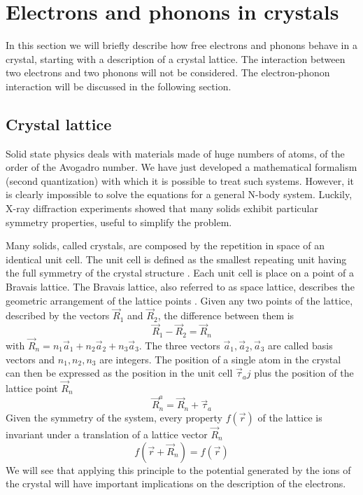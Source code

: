 \section{Electrons and phonons in crystals}
In this section we will briefly describe how free electrons and phonons behave in a crystal, starting with a description of a crystal lattice. The interaction between two electrons and two phonons will not be considered. The electron-phonon interaction will be discussed in the following section.
\subsection{Crystal lattice}
Solid state physics deals with materials made of huge numbers of atoms, of the order of the Avogadro number. We have just developed a mathematical formalism (second quantization) with which it is possible to treat such systems. However, it is clearly impossible to solve the equations for a general N-body system. Luckily, X-ray diffraction experiments showed that many solids exhibit particular symmetry properties, useful to simplify the problem.

Many solids, called crystals, are composed by the repetition in space of an identical unit cell. The unit cell is defined as the smallest repeating unit having the full symmetry of the crystal structure \cite{westBasicSolidState1999}.
Each unit cell is place on a point of a Bravais lattice. The Bravais lattice, also referred to as space lattice, describes the geometric arrangement of the lattice points \cite{lernerEncyclopediaPhysicsVolumes2005}. Given any two points of the lattice, described by the vectors $\vec{R}_1$ and $\vec{R}_2$, the difference between them is
\begin{equation}
    \vec{R}_1 - \vec{R}_2 = \vec{R}_n
\end{equation}
with $\vec{R}_n = n_1\vec{a}_1 + n_2\vec{a}_2 + n_3\vec{a}_3$. The three vectors $\vec{a}_1, \vec{a}_2, \vec{a}_3$ are called basis vectors and $n_1, n_2, n_3$ are integers. The position of a single atom in the crystal can then be expressed as the position in the unit cell $\vec{\tau}_aj$ plus the position of the lattice point $\vec{R}_n$
\begin{equation}
    \vec{R}_n^a = \vec{R}_n + \vec{\tau}_a
\end{equation}
Given the symmetry of the system, every property $f(\vec{r})$ of the lattice is invariant under a translation of a lattice vector $\vec{R}_n$
\begin{equation} \label{eq:translational_invariance}
    f(\vec{r}+\vec{R}_n) = f(\vec{r})
\end{equation}
We will see that applying this principle to the potential generated by the ions of the crystal will have important implications on the description of the electrons.

